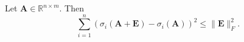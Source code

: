 \documentclass[journal]{IEEEtran}
\begin{document}
\begin{Lemma2}\label{lem:mirsky}
	Let $\mathbf{A}\in\mathbb{R}^{n\times m}$. Then 
	\[
	\sum_{i=1}^n \left(\sigma_i(\mathbf{A}+\mathbf{E}) - \sigma_i(\mathbf{A}) \right)^2 \leq \|\mathbf{E}\|_F^2.
	\]
\end{Lemma2}
%
%
%
%
%
%
%
%
%
%
%
%
%
%
%
%
\end{document}
